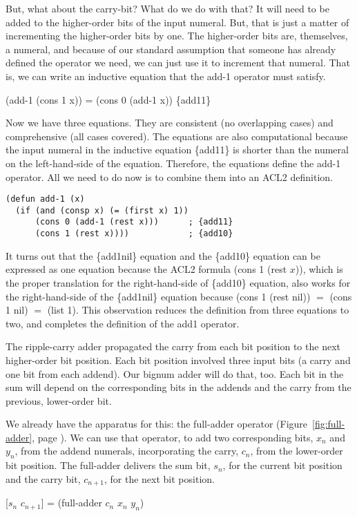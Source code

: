 But, what about the carry-bit? What do we do with that?
It will need to be added to the higher-order bits of
the input numeral. But, that is just a matter of incrementing
the higher-order bits by one.
The higher-order bits are, themselves, a numeral,
and because of our standard assumption that
someone has already defined the operator we need,
we can just use it to increment that numeral.
That is, we can write an inductive equation that the add-1 operator
must satisfy.

\hspace{1cm}  (add-1 (cons 1 x)) = (cons 0 (add-1 x))   \hfill \{add11\}

Now we have three equations.
They are consistent (no overlapping cases) and
comprehensive (all cases covered).
The equations are also computational because the input numeral in
the inductive equation \{add11\} is shorter than
the numeral on the left-hand-side of the equation.
Therefore, the equations define the add-1 operator.
All we need to do now is to combine them into an ACL2 definition.

\label{add-1-defun}
\begin{Verbatim}
(defun add-1 (x)
  (if (and (consp x) (= (first x) 1))
      (cons 0 (add-1 (rest x)))      ; {add11}
      (cons 1 (rest x))))            ; {add10}
\end{Verbatim}

It turns out that the \{add1nil\} equation
and the \{add10\} equation can be expressed as one equation because
the ACL2 formula (cons 1 (rest $x$)), which is the proper
translation for the right-hand-side of \{add10\} equation,
also works for the right-hand-side of the \{add1nil\} equation
because (cons 1 (rest nil)) $=$ (cons 1 nil) $=$ (list 1).
This observation reduces the definition from three equations to two,
and completes the definition of the add1 operator.

The ripple-carry adder propagated the carry from each bit position
to the next higher-order bit position.
Each bit position involved three input bits
(a carry and one bit from each addend).
Our bignum adder will do that, too.
Each bit in the sum will depend on the
corresponding bits in the addends and the carry from
the previous, lower-order bit.

We already have the apparatus for this: the full-adder operator
(Figure~\ref{fig:full-adder},  page \pageref{fig:full-adder}).
We can use that operator, to add two corresponding bits,
$x_n$ and $y_n$, from the addend numerals,
incorporating the carry, $c_n$, from the lower-order bit position.
The full-adder delivers the sum bit, $s_n$, for the current
bit position and the carry bit, $c_{n+1}$, for the next bit position.
\begin{center}
[$s_n$ $c_{n+1}$] = (full-adder $c_n$ $x_n$ $y_n$)
\end{center}

